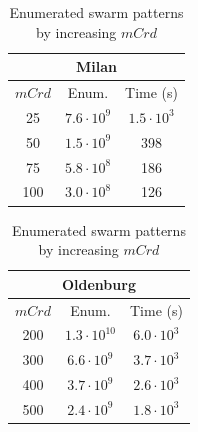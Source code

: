 \documentclass[
]{ceurart}
\renewcommand{\sf}[1]{\textsf{\textup{#1}}}
\begin{document}
\begin{table}[t]
\scriptsize\centering
\caption{Enumerated swarm patterns by increasing $mCrd$}
\label{tab:effcard}%

\begin{tabular}{ccc}
\multicolumn{3}{c}{\sf{Milan}}\\
\toprule
$mCrd$ &         Enum. &          Time (s)     \\
\midrule
    25 &  $7.6\cdot10^{9}$ &  $1.5\cdot10^{3}$ \\
    50 &  $1.5\cdot10^{9}$ &               398 \\
    75 &  $5.8\cdot10^{8}$ &               186 \\
   100 &  $3.0\cdot10^{8}$ &               126 \\
\bottomrule
\end{tabular}
\begin{tabular}{ccc}
\multicolumn{3}{c}{\sf{Oldenburg}}\\
\toprule
$mCrd$ &         Enum. &          Time (s) \\
\midrule
200 &  $1.3\cdot10^{10}$ &  $6.0\cdot10^{3}$ \\
300 &   $6.6\cdot10^{9}$ &  $3.7\cdot10^{3}$ \\
400 &   $3.7\cdot10^{9}$ &  $2.6\cdot10^{3}$ \\
500 &   $2.4\cdot10^{9}$ &  $1.8\cdot10^{3}$ \\
\bottomrule
\end{tabular}
% 
\end{table}%
\end{document}
